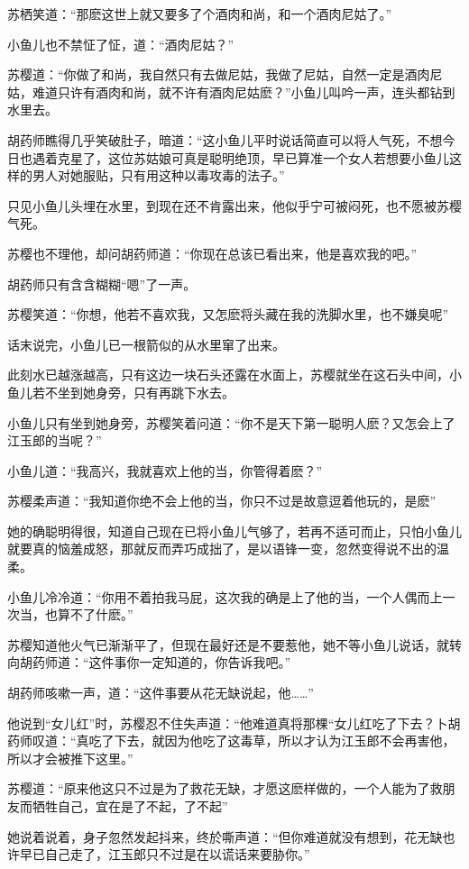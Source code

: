 \documentclass[12pt,oneside]{book}
\begin{document}
苏栖笑道：``那麽这世上就又要多了个酒肉和尚，和一个酒肉尼姑了。''

小鱼儿也不禁怔了怔，道：``酒肉尼姑？''

苏樱道：``你做了和尚，我自然只有去做尼姑，我做了尼姑，自然一定是酒肉尼姑，难道只许有酒肉和尚，就不许有酒肉尼姑麽？''小鱼儿叫吟一声，连头都钻到水里去。

胡药师瞧得几乎笑破肚子，暗道：``这小鱼儿平时说话简直可以将人气死，不想今日也遇着克星了，这位苏姑娘可真是聪明绝顶，早已算准一个女人若想要小鱼儿这样的男人对她服贴，只有用这种以毒攻毒的法子。''

只见小鱼儿头埋在水里，到现在还不肯露出来，他似乎宁可被闷死，也不愿被苏樱气死。

苏樱也不理他，却问胡药师道：``你现在总该已看出来，他是喜欢我的吧。''

胡药师只有含含糊糊``嗯''了一声。

苏樱笑道：``你想，他若不喜欢我，又怎麽将头藏在我的洗脚水里，也不嫌臭呢''

话末说完，小鱼儿已一根箭似的从水里窜了出来。

此刻水已越涨越高，只有这边一块石头还露在水面上，苏樱就坐在这石头中间，小鱼儿若不坐到她身旁，只有再跳下水去。

小鱼儿只有坐到她身旁，苏樱笑着问道：``你不是天下第一聪明人麽？又怎会上了江玉郎的当呢？''

小鱼儿道：``我高兴，我就喜欢上他的当，你管得着麽？''

苏樱柔声道：``我知道你绝不会上他的当，你只不过是故意逗着他玩的，是麽''

她的确聪明得很，知道自己现在已将小鱼儿气够了，若再不适可而止，只怕小鱼儿就要真的恼羞成怒，那就反而弄巧成拙了，是以语锋一变，忽然变得说不出的温柔。

小鱼儿冷冷道：``你用不着拍我马屁，这次我的确是上了他的当，一个人偶而上一次当，也算不了什麽。''

苏樱知道他火气已渐渐平了，但现在最好还是不要惹他，她不等小鱼儿说话，就转向胡药师道：``这件事你一定知道的，你告诉我吧。''

胡药师咳嗽一声，道：``这件事要从花无缺说起，他\ldots\ldots{}''

他说到``女儿红''时，苏樱忍不住失声道：``他难道真将那棵``女儿红吃了下去？卜胡药师叹道：``真吃了下去，就因为他吃了这毒草，所以才认为江玉郎不会再害他，所以才会被推下这里。''

苏樱道：``原来他这只不过是为了救花无缺，才愿这麽样做的，一个人能为了救朋友而牺牲自己，宜在是了不起，了不起''

她说着说着，身子忽然发起抖来，终於嘶声道：``但你难道就没有想到，花无缺也许早已自己走了，江玉郎只不过是在以谎话来要胁你。''
\end{document}
